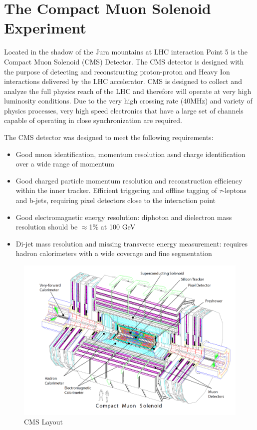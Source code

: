 \chapter{The Compact Muon Solenoid Experiment}
Located in the shadow of the Jura mountains
at LHC interaction Point 5 is the Compact Muon Solenoid (CMS) Detector. 
The CMS detector is designed with the purpose of detecting and reconstructing
proton-proton and Heavy Ion interactions delivered by the LHC accelerator.
CMS is designed to collect and analyze the full physics reach of the LHC and 
therefore will operate at very high luminosity conditions. Due to the very high
crossing rate (40MHz) and variety of physics processes, very high speed electronics
that have a large set of channels capable of operating in close synchronization are required.


The CMS detector was designed to meet the following requirements:
\begin{itemize}
\item Good muon identification, momentum resolution asnd charge identification over a wide range of momentum 
\item Good charged particle momentum resolution and reconstruction efficiency within the inner tracker. Efficient
triggering and offline tagging of $\tau$-leptons and b-jets, requiring pixel detectors close to the interaction point
\item Good electromagnetic energy resolution: diphoton and dielectron mass resolution should
be $\approx$1$\%$ at 100 GeV
\item Di-jet mass resolution and missing transverse energy measurement: requires hadron
calorimeters with a wide coverage and fine segmentation
\end{itemize}
\begin{figure}[hb]
  \centering
	\includegraphics[width=1\textwidth]{images/CMSLayout.png}
  	\caption[CMS Layout]
   	{CMS Layout}
	\label{fig:CMSLayout}
\end{figure}

